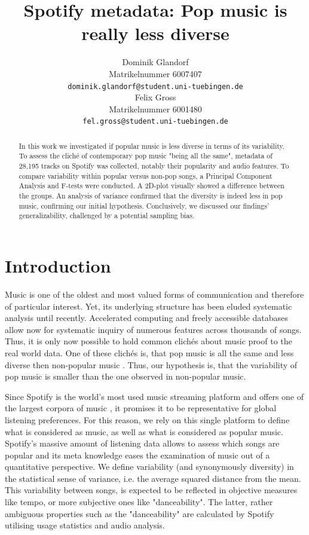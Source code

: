 \documentclass{article}
\title{Spotify metadata: Pop music is really less diverse}
\author{%
  Dominik Glandorf\\
  Matrikelnummer 6007407\\
  \texttt{dominik.glandorf@student.uni-tuebingen.de} \\
  \And
  Felix Gross\\
  Matrikelnummer 6001480\\
  \texttt{fel.gross@student.uni-tuebingen.de} \\
}
\begin{document}
\maketitle

\begin{abstract}
In this work we investigated if popular music is less diverse in terms of its variability.
To assess the cliché of contemporary pop music "being all the same",
metadata of 28,195 tracks on Spotify was collected, notably their popularity and audio features. To compare variability within popular versus non-pop songs, a Principal Component Analysis and F-tests were conducted.
A 2D-plot visually showed a difference between the groups. An analysis of variance confirmed that the diversity is indeed less in pop music, confirming our initial hypothesis.
Conclusively, we discussed our findings' generalizability, challenged by a potential sampling bias. 
\end{abstract}

\section{Introduction}
Music is one of the oldest and most valued forms of communication and therefore of particular interest. Yet, its underlying structure has been eluded systematic analysis until recently.
Accelerated computing and freely accessible databases allow now for systematic inquiry of numerous features across thousands of songs. Thus, it is only now possible to hold common clichés about music proof to the real world data.
One of these clichés is, that pop music is all the same and less diverse then non-popular music \citep{serra2012measuring}. Thus, our hypothesis is, that the variability of pop music is smaller than the one observed in non-popular music.

Since Spotify is the world's most used music streaming platform and offers one of the largest corpora of music \citep{quarterlyReport}, it promises it to be representative for global listening preferences. For this reason, we rely on this single platform to define what is considered as music, as well as what is considered as popular music. Spotify's massive amount of listening data allows to assess which songs are popular and its meta knowledge eases the examination of music out of a quantitative perspective.
We define variability (and synonymously diversity) in the statistical sense of variance, i.e. the average squared distance from the mean. This variability between songs, is expected to be reflected in objective measures like tempo, or more subjective ones like "danceability".  The latter, rather ambiguous properties such as the "danceability" are calculated by Spotify utilising usage statistics and audio analysis.
\end{document}
